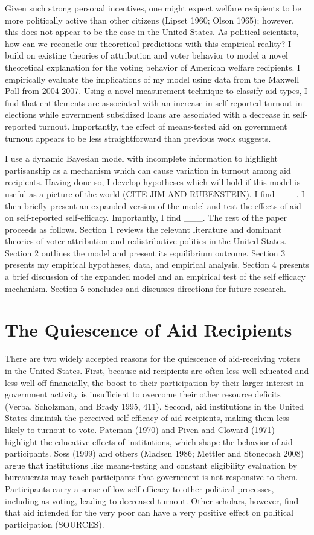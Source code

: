 \documentclass[12pt]{paper}
\begin{document}
Given such strong personal incentives, one might expect welfare recipients to be more politically active than other citizens (Lipset 1960; Olson 1965); however, this does not appear to be the case in the United States. As political scientists, how can we reconcile our theoretical predictions with this empirical reality? I build on existing theories of attribution and voter behavior to model a novel theoretical explanation for the voting behavior of American welfare recipients. I empirically evaluate the implications of my model using data from the Maxwell Poll from 2004-2007. Using a novel measurement technique to classify aid-types, I find that entitlements are associated with an increase in self-reported turnout in elections while government subsidized loans are associated with a decrease in self-reported turnout. Importantly, the effect of means-tested aid on government turnout appears to be less straightforward than previous work suggests.

I use a dynamic Bayesian model with incomplete information to highlight partisanship as a mechanism which can cause variation in turnout among aid recipients. Having done so, I develop hypotheses which will hold if this model is useful as a picture of the world (CITE JIM AND RUBENSTEIN). I find ___. I then briefly present an expanded version of the model and test the effects of aid on self-reported self-efficacy. Importantly, I find ___. The rest of the paper proceeds as follows. Section 1 reviews the relevant literature and dominant theories of voter attribution and redistributive politics in the United States. Section 2 outlines the model and present its equilibrium outcome. Section 3 presents my empirical hypotheses, data, and empirical analysis. Section 4 presents a brief discussion of the expanded model and an empirical test of the self efficacy mechanism. Section 5 concludes and discusses directions for future research.

\section{The Quiescence of Aid Recipients}
There are two widely accepted reasons for the quiescence of aid-receiving voters in the United States. First, because aid recipients are often less well educated and less well off financially, the boost to their participation by their larger interest in government activity is insufficient to overcome their other resource deficits (Verba, Scholzman, and Brady 1995, 411). Second, aid institutions in the United States diminish the perceived self-efficacy of aid-recipients, making them less likely to turnout to vote. Pateman (1970) and Piven and Cloward (1971) highlight the educative effects of institutions, which shape the behavior of aid participants. Soss (1999) and others (Madsen 1986; Mettler and Stonecash 2008) argue that institutions like means-testing and constant eligibility evaluation by bureaucrats may teach participants that government is not responsive to them. Participants carry a sense of low self-efficacy to other political processes, including as voting, leading to decreased turnout. Other scholars, however, find that aid intended for the very poor can have a very positive effect on political participation (SOURCES).
\end{document}
